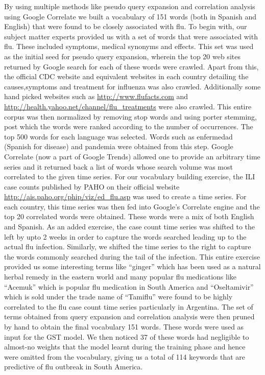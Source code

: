 
By using multiple methods like pseudo query expansion and correlation
analysis using Google Correlate we built a vocabulary of 151 words (both
in Spanish and English) that were found to be closely associated with
flu. To begin with, our subject matter experts provided us with a set of
words that were associated with flu. These included symptoms, medical
synonyms and effects. This set was used as the initial seed for pseudo
query expansion, wherein the top 20 web sites returned by Google search
for each of these words were crawled. Apart from this, the official CDC
website and equivalent websites in each country detailing the
causes,symptoms and treatment for influenza was also crawled.
Additionally some hand picked websites such as
\url{http://www.flufacts.com}
and \url{http://health.yahoo.net/channel/flu\_treatments} were also crawled.
This entire corpus was then normalized by removing stop words and using
porter stemming, post which the words were ranked according to the
number of occurrences. The top 500 words for each language was selected.
Words such as enfermedad (Spanish for disease) and pandemia were
obtained from this step.  Google Correlate (now a part of Google Trends)
allowed one to provide an arbitrary time series and it returned back a
list of words whose search volume was most correlated to the given time
series. For our vocabulary building exercise, the ILI case counts
published by PAHO on their official website
\url{http://ais.paho.org/phip/viz/ed\_flu.asp} was used to create a time
series. For each country, this time series was then fed into Google's
Correlate engine and the top 20 correlated words were obtained. These
words were a mix of both English and Spanish. As an added exercise, the
case count time series was shifted to the left by upto 2 weeks in order
to capture the words searched leading up to the actual flu infection.
Similarly, we shifted the time series to the right to capture the words
commonly searched during the tail of the infection. This entire exercise
provided us some interesting terms like ``ginger'' which has been used as
a natural herbal remedy in the eastern world and many popular flu
medications like ``Acemuk'' which is popular flu medication in South
America and  ``Oseltamivir'' which is sold under the trade name of
``Tamiflu'' were found to be highly correlated to the flu case count time
series particularly in Argentina.   The set of terms obtained from query
expansion and correlation analysis were then pruned by hand to obtain
the final vocabulary 151 words. These words were used as input for the
GST model. We then noticed 37 of these words had negligible to almost-no
weights that the model learnt during the training phase and hence were
omitted from the vocabulary, giving us a total of 114 keywords that are
predictive of flu outbreak in South America.
